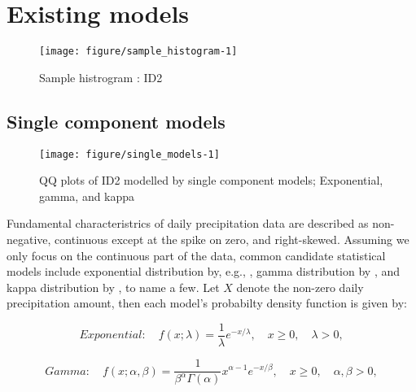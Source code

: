 \documentclass[12pt]{article}\usepackage[]{graphicx}\usepackage[]{color}
\makeatletter
\def\maxwidth{ %
  \ifdim\Gin@nat@width>\linewidth
    \linewidth
  \else
    \Gin@nat@width
  \fi
}
\makeatother
\begin{document}
\section{Existing models}


\begin{figure}
\texttt{[image: figure/sample\_histogram-1]} \caption[Sample histrogram ]{Sample histrogram : ID2}\label{fig:sample histogram}
\end{figure}



	\subsection{Single component models}

\begin{figure}
\texttt{[image: figure/single\_models-1]} \caption[QQ plots of ID2 modelled by single component models]{QQ plots of ID2 modelled by single component models; Exponential, gamma, and kappa}\label{fig:single_models}
\end{figure}




Fundamental characteristrics of daily precipitation data are described as non-negative, continuous except at the spike on zero, and right-skewed. Assuming we only focus on the continuous part of the data, common candidate statistical models include exponential distribution by, e.g., \cite{todorovic1975stochastic}, gamma distribution by \cite{ison1971wet, wilks1999interannual, schoof2010development}, and kappa  distribution by \cite{mielke1973three}, to name a few. Let $X$ denote the non-zero daily precipitation amount, then each model's probabilty density function is given by:

\begin{equation}
  \label{eq:exponential.pdf} 
Exponential: \quad   f(x ; \lambda) = \frac{1} {\lambda} e^{-x / \lambda}, \quad x \geq 0, \quad \lambda > 0,
\end{equation}


\begin{equation}
  \label{eq:gamma.pdf} 
Gamma: \quad   f(x ; \alpha, \beta) = \frac {1} {\beta^\alpha \Gamma(\alpha)} x^{\alpha - 1} e^{-x/\beta} , \quad x \geq 0, \quad \alpha, \beta > 0,
\end{equation}
\end{document}
